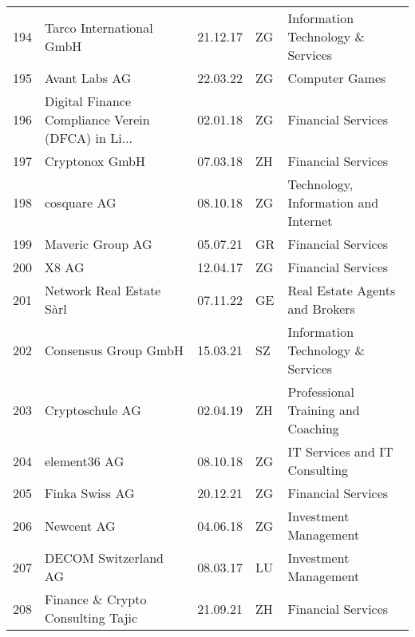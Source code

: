\begin{tabular}{lllll}
194 &                           Tarco International GmbH &      21.12.17 &     ZG &              Information Technology \& Services \\
195 &                                      Avant Labs AG &      22.03.22 &     ZG &                                 Computer Games \\
196 &  Digital Finance Compliance Verein (DFCA) in Li... &      02.01.18 &     ZG &                             Financial Services \\
197 &                                     Cryptonox GmbH &      07.03.18 &     ZH &                             Financial Services \\
198 &                                        cosquare AG &      08.10.18 &     ZG &           Technology, Information and Internet \\
199 &                                   Maveric Group AG &      05.07.21 &     GR &                             Financial Services \\
200 &                                              X8 AG &      12.04.17 &     ZG &                             Financial Services \\
201 &                           Network Real Estate Sàrl &      07.11.22 &     GE &                 Real Estate Agents and Brokers \\
202 &                               Consensus Group GmbH &      15.03.21 &     SZ &              Information Technology \& Services \\
203 &                                    Cryptoschule AG &      02.04.19 &     ZH &             Professional Training and Coaching \\
204 &                                       element36 AG &      08.10.18 &     ZG &                  IT Services and IT Consulting \\
205 &                                     Finka Swiss AG &      20.12.21 &     ZG &                             Financial Services \\
206 &                                         Newcent AG &      04.06.18 &     ZG &                          Investment Management \\
207 &                               DECOM Switzerland AG &      08.03.17 &     LU &                          Investment Management \\
208 &                  Finance \& Crypto Consulting Tajic &      21.09.21 &     ZH &                             Financial Services \\

\end{tabular}
